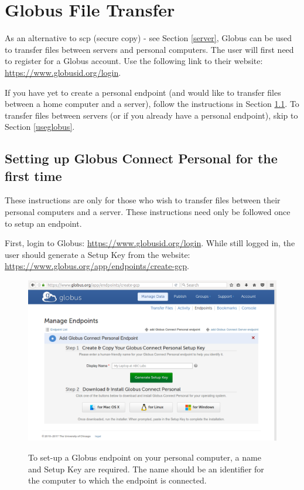 \documentclass[12pt]{article}
\begin{document}
\section{Globus File Transfer}\label{globus-main}

\quad As an alternative to scp (secure copy) - see Section \ref{server}, Globus can be used to transfer files between servers and personal computers. The user will first need to register for a Globus account. Use the following link to their website: \url{https://www.globusid.org/login}.

\quad If you have yet to create a personal endpoint (and would like to transfer files between a home computer and a server), follow the instructions in Section \ref{globus-setup}. To transfer files between servers (or if you already have a personal endpoint), skip to Section \ref{useglobus}.

\subsection{Setting up Globus Connect Personal for the first time}\label{globus-setup}

\quad These instructions are only for those who wish to transfer files between their personal computers and a server. These instructions need only be followed once to setup an endpoint. 

\quad First, login to Globus: \url{https://www.globusid.org/login}. While still logged in, the user should generate a Setup Key from the website: \url{https://www.globus.org/app/endpoints/create-gcp}.

\begin{figure}[H]
\centering
\caption{To set-up a Globus endpoint on your personal computer, a name and Setup Key are required. The name should be an identifier for the computer to which the endpoint is connected.}
\includegraphics[width=\textwidth]{globus-1}
\label{globus-1}
\end{figure}
\end{document}
